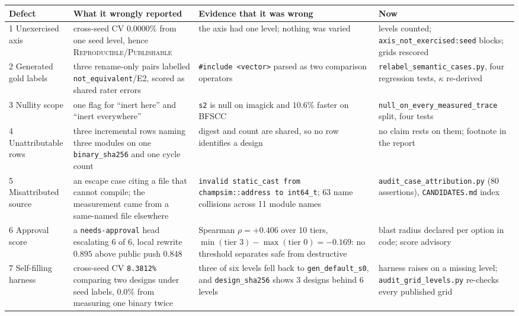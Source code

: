 \documentclass[sigconf,anonymous,nonacm]{acmart}
\begin{document}
\begin{table}[t]
\centering\scriptsize
\setlength{\tabcolsep}{3pt}
\begin{tabular}{p{} p{} p{} p{}}
\toprule
\textbf{Defect} & \textbf{What it wrongly reported} & \textbf{Evidence that it was wrong} & \textbf{Now} \\
\midrule
1 Unexercised axis & cross-seed CV $0.0000\%$ from one seed level, hence \textsc{Reproducible}/\textsc{Publishable} & the axis had one level; nothing was varied & levels counted; \texttt{axis\_not\_exercised:seed} blocks; grids rescored \\
2 Generated gold labels & three rename-only pairs labelled \texttt{not\_equivalent}/E2, scored as shared rater errors & \texttt{\#include <vector>} parsed as two comparison operators & \texttt{relabel\_semantic\_cases.py}, four regression tests, $\kappa$ re-derived \\
3 Nullity scope & one flag for ``inert here'' and ``inert everywhere'' & \texttt{s2} is null on imagick and $10.6\%$ faster on BFSCC & \texttt{null\_on\_every\_measured\_trace} split, four tests \\
4 Unattributable rows & three incremental rows naming three modules on one \texttt{binary\_sha256} and one cycle count & digest and count are shared, so no row identifies a design & no claim rests on them; footnote in the report \\
5 Misattributed source & an escape case citing a file that cannot compile; the measurement came from a same-named file elsewhere & \texttt{invalid static\_cast from champsim::address to int64\_t}; 63 name collisions across 11 module names & \texttt{audit\_case\_attribution.py} (80 assertions), \texttt{CANDIDATES.md} index \\
6 Approval score & a \texttt{needs-approval} head escalating 6 of 6, local rewrite $0.895$ above public push $0.848$ & Spearman $\rho=+0.406$ over 10 tiers, $\min(\text{tier }3)-\max(\text{tier }0)=-0.169$: no threshold separates safe from destructive & blast radius declared per option in code; score advisory \\
7 Self-filling harness & cross-seed CV \texttt{8.3812\%} comparing two designs under seed labels, $0.0\%$ from measuring one binary twice & three of six levels fell back to \texttt{gen\_default\_s0}, and \texttt{design\_sha256} shows 3 designs behind 6 levels & harness raises on a missing level; \texttt{audit\_grid\_levels.py} re-checks every published grid \\

\end{tabular}
\end{table}
\end{document}

